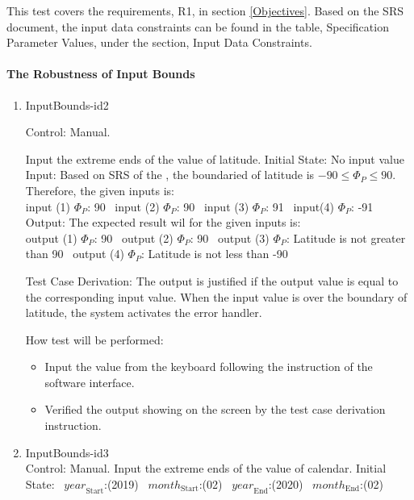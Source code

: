 \documentclass[12pt, titlepage]{article}
\begin{document}
This test covers the requirements, R1, in section \ref{Objectives}. Based on
the SRS document\cite{YS2019}, the input data constraints can be found in the
table, Specification Parameter Values, under the section, Input Data
Constraints.


\paragraph{The Robustness of Input Bounds} 
\begin{enumerate}
\item{InputBounds-id2\\} 

Control: Manual. 

Input the extreme ends of the value of latitude. 
Initial State: No input value
Input: Based on SRS\cite{YS2019} of the \progname\cite{YS2019}, the boundaried
of latitude is $-90 \leq \Phi_P \leq 90$.\\
Therefore, the given inputs is:\\
input (1) $\Phi_P$: 90 
~input (2) $\Phi_P$: 90 
~input (3) $\Phi_P$: 91 
~input(4) $\Phi_P$: -91\\ 

Output: The expected result wil for the given inputs is:\\
output (1) $\Phi_P$: 90 
~output (2) $\Phi_P$: 90 
~output (3) $\Phi_P$: Latitude is not greater than 90 
~output (4) $\Phi_P$: Latitude is not less than -90\\


Test Case Derivation: The output is justified if the output value is equal to
the corresponding input value. When the input value is over the boundary 
of latitude, the system activates the error handler. \\ 

How test will be performed:

\begin{itemize} 

\item Input the value from the keyboard following the instruction of the
software interface.
\item Verified the output showing on the screen by the test case derivation
instruction.
\end{itemize}
\item{InputBounds-id3\\}
Control: Manual. 
Input the extreme ends of the value of calendar. 
Initial State:
~$\mathit{year}_\text{Start}$:(2019) 
~$\mathit{month}_\text{Start}$:(02)
~$\mathit{year}_\text{End}$:(2020) 
~$\mathit{month}_\text{End}$:(02) 


\end{enumerate}
\end{document}
